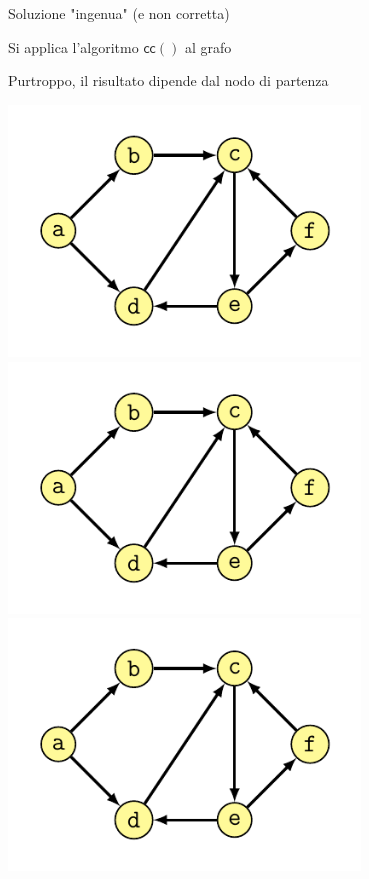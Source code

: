 \begin{frame}{Soluzione "ingenua" (e non corretta)}

\BIL
\item Si applica l'algoritmo $\textsf{cc}()$ al grafo 
\item Purtroppo, il risultato dipende dal nodo di partenza
\EIL

\begin{overprint}
\centering\includegraphics[width=0.70\textwidth,page=3]{scc.pdf}
\centering\includegraphics[width=0.70\textwidth,page=4]{scc.pdf}
\centering\includegraphics[width=0.70\textwidth,page=5]{scc.pdf}
\end{overprint}

\end{frame}

